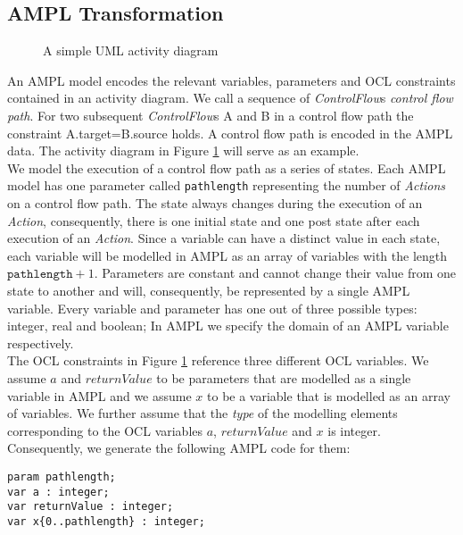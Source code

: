 \documentclass[runningheads,a4paper]{llncs}%
\newcommand{\UMLType}[1]{\textsf{\textit{#1}}} %
\newcommand{\UMLReference}[1]{\textsf{\textit{#1}}} %
\newcommand{\AMPLCode}[1]{\texttt{#1}}
\begin{document}
\subsection{AMPL Transformation}%
\label{sec:AMPLTransformation}%
\begin{figure}%
\def\svgwidth{\textwidth}%
\graphicspath{{./pics/}}%
%
\caption{A simple UML activity diagram}%
\label{fig:AssignmentDecision}%
\end{figure}%
An AMPL model encodes the relevant variables, parameters and OCL constraints contained in an activity diagram. We call a sequence of \UMLReference{ControlFlow}s \emph{control flow path}. For two subsequent \UMLType{ControlFlow}s A and B in a control flow path the constraint A.target=B.source holds. A control flow path is encoded in the AMPL data. The activity diagram in Figure \ref{fig:AssignmentDecision} will serve as an example.\\%
We model the execution of a control flow path as a series of states. Each AMPL model has one parameter called \AMPLCode{pathlength} representing the number of \UMLType{Actions} on a control flow path. The state always changes during the execution of an \UMLType{Action}, consequently, there is one initial state and one post state after each execution of an \UMLType{Action}. Since a variable can have a distinct value in each state, each variable will be modelled in AMPL as an array of variables with the length $\AMPLCode{pathlength}+1$. Parameters are constant and cannot change their value from one state to another and will, consequently, be represented by a single AMPL variable. Every variable and parameter has one out of three possible types: integer, real and boolean; In AMPL we specify the domain of an AMPL variable respectively.\\%
The OCL constraints in Figure \ref{fig:AssignmentDecision} reference three different OCL variables. We assume $a$ and $returnValue$ to be parameters that are modelled as a single variable in AMPL and we assume $x$ to be a variable that is modelled as an array of variables. We further assume that the \UMLReference{type} of the modelling elements corresponding to the OCL variables $a$, $returnValue$ and $x$ is integer. Consequently, we generate the following AMPL code for them: %
\begin{lstlisting}[basicstyle=\ttfamily,language=ampl]
param pathlength;
var a : integer;
var returnValue : integer;
var x{0..pathlength} : integer;
\end{lstlisting}%
\end{document}
